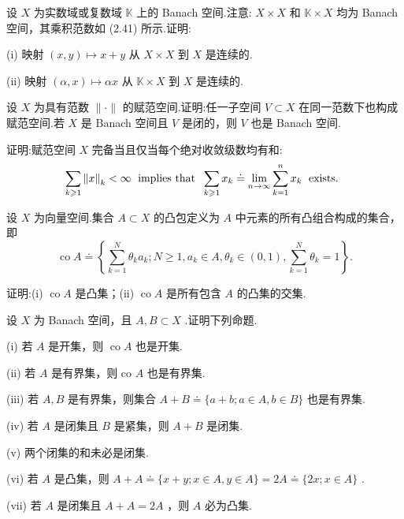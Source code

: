 \begin{rbhw}
设 $X$ 为实数域或复数域 $\mathbb{K}$ 上的 Banach 空间.注意: $X \times  X$ 和 $\mathbb{K} \times  X$ 均为 Banach 空间，其乘积范数如 (2.41) 所示.证明:

(i) 映射 $\left( {x,y}\right)  \mapsto  x + y$ 从 $X \times  X$ 到 $X$ 是连续的.

(ii) 映射 $\left( {\alpha ,x}\right)  \mapsto  {\alpha x}$ 从 $\mathbb{K} \times  X$ 到 $X$ 是连续的.
\end{rbhw}


\begin{rbhw}
设 $X$ 为具有范数 $\|  \cdot  \|$ 的赋范空间.证明:任一子空间 $V \subset  X$ 在同一范数下也构成赋范空间.若 $X$ 是 Banach 空间且 $V$ 是闭的，则 $V$ 也是 Banach 空间.
\end{rbhw}

\begin{rbhw}
证明:赋范空间 $X$ 完备当且仅当每个绝对收敛级数均有和:
\[
\mathop{\sum }\limits_{{k \geqslant  1}}\norm{x}_{k} < \infty \;\text{ implies that }\;\mathop{\sum }\limits_{{k \geqslant  1}}{x}_{k} \doteq  \mathop{\lim }\limits_{{n \rightarrow  \infty }}\mathop{\sum }\limits_{{k = 1}}^{n}{x}_{k}\;\text{ exists. }
\]
\end{rbhw}

\begin{rbhw}
设 $X$ 为向量空间.集合 $A \subset  X$ 的凸包定义为 $A$ 中元素的所有凸组合构成的集合，即
\[
\operatorname{co}A \doteq  \left\{  {\mathop{\sum }\limits_{{k = 1}}^{N}{\theta }_{k}{a}_{k};N \geq  1,{a}_{k} \in  A,{\theta }_{k} \in  \left(  {0,1}\right)  ,\mathop{\sum }\limits_{{k = 1}}^{N}{\theta }_{k} = 1}\right\}  .
\]

证明:(i) $\operatorname{co}A$ 是凸集；(ii) $\operatorname{co}A$ 是所有包含 $A$ 的凸集的交集.
\end{rbhw}

\begin{rbhw}
设 $X$ 为 Banach 空间，且 $A,B \subset  X$ .证明下列命题.

(i) 若 $A$ 是开集，则 $\operatorname{co}A$ 也是开集.

(ii) 若 $A$ 是有界集，则 co $A$ 也是有界集.

(iii) 若 $A,B$ 是有界集，则集合 $A + B \doteq  \{ a + b;a \in  A,b \in  B\}$ 也是有界集.

(iv) 若 $A$ 是闭集且 $B$ 是紧集，则 $A + B$ 是闭集.

(v) 两个闭集的和未必是闭集.

(vi) 若 $A$ 是凸集，则 $A + A \doteq  \{ x + y;x \in  A,y \in  A\}  = {2A} \doteq  \{ {2x};x \in  A\}$ .

(vii) 若 $A$ 是闭集且 $A + A = {2A}$ ，则 $A$ 必为凸集.
\end{rbhw}

